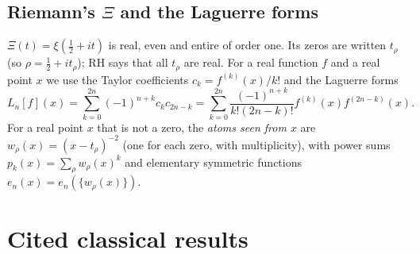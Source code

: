 \documentclass[11pt]{amsart}
\theoremstyle{plain}
\theoremstyle{definition}
\begin{document}
\subsection{Riemann's $\Xi$ and the Laguerre forms}
$\Xi(t)=\xi(\tfrac12+it)$ is real, even and entire of order one. Its zeros are
written $t_\rho$ (so $\rho=\tfrac12+it_\rho$); RH says that all $t_\rho$ are real.
For a real function $f$ and a real point $x$ we use the Taylor coefficients
$c_k=f^{(k)}(x)/k!$ and the Laguerre forms
\begin{equation}\label{eq:Ln}
L_n[f](x)=\sum_{k=0}^{2n}(-1)^{n+k}c_kc_{2n-k}
=\sum_{k=0}^{2n}\frac{(-1)^{n+k}}{k!(2n-k)!}f^{(k)}(x)f^{(2n-k)}(x).
\end{equation}
For a real point $x$ that is not a zero, the \emph{atoms seen from $x$} are
$w_\rho(x)=(x-t_\rho)^{-2}$ (one for each zero, with multiplicity), with power
sums $p_k(x)=\sum_\rho w_\rho(x)^k$ and elementary symmetric functions
$e_n(x)=e_n(\{w_\rho(x)\})$.

\section{Cited classical results}\label{sec:cited}
\end{document}
